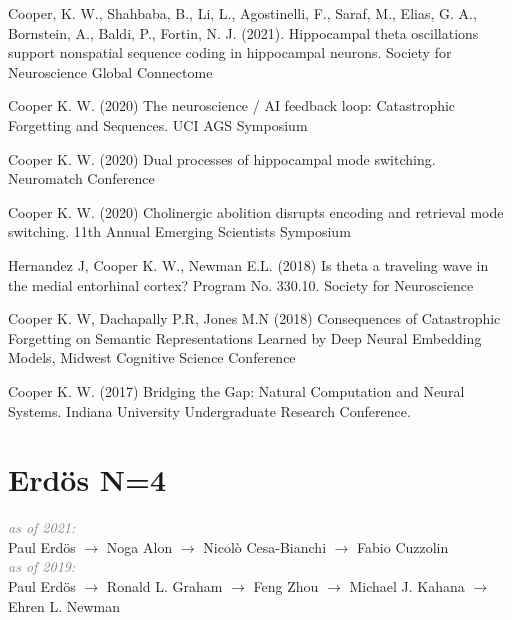 \documentclass[10pt]{cooperCV2}
\begin{document}
\begin{etaremune}[itemindent=-\bibhang, topsep=0pt,
				   itemsep=\bibsep,partopsep=0pt,parsep=0pt,leftmargin={\bibhang+\widthof{[999]}}] 
    \item  Cooper, K. W., Shahbaba, B., Li, L., Agostinelli, F., Saraf, M., Elias, G. A., Bornstein, A., Baldi, P.,  Fortin, N. J. (2021). Hippocampal theta oscillations support nonspatial sequence coding in hippocampal neurons. Society for Neuroscience Global Connectome


    \item  Cooper K. W. (2020) The neuroscience / AI feedback loop: Catastrophic Forgetting and Sequences. UCI AGS Symposium


    \item Cooper K. W. (2020) Dual processes of hippocampal mode switching. Neuromatch Conference

    \item Cooper K. W. (2020) Cholinergic abolition disrupts encoding and retrieval mode switching. 11th Annual Emerging Scientists Symposium

    \item Hernandez J, Cooper K. W., Newman E.L. (2018) Is theta a traveling wave in the medial entorhinal cortex? Program No. 330.10. Society for Neuroscience

    \item Cooper K. W, Dachapally P.R, Jones M.N (2018) Consequences of Catastrophic Forgetting on Semantic Representations Learned by Deep Neural Embedding Models, Midwest Cognitive Science Conference

    \item Cooper K. W. (2017) Bridging the Gap: Natural Computation and Neural Systems. Indiana University Undergraduate Research Conference.

\end{etaremune}



















\section{Erdös N=4}

\textit{\textcolor{grey}{as of 2021:}}\\
Paul Erdös $\rightarrow$ Noga Alon $\rightarrow$ Nicolò Cesa-Bianchi $\rightarrow$ Fabio Cuzzolin\\

\textit{\textcolor{grey}{as of 2019:}}\\
Paul Erdös $\rightarrow$ Ronald L. Graham $\rightarrow$ Feng Zhou $\rightarrow$ Michael J. Kahana $\rightarrow$ Ehren L. Newman\\
\end{document}

